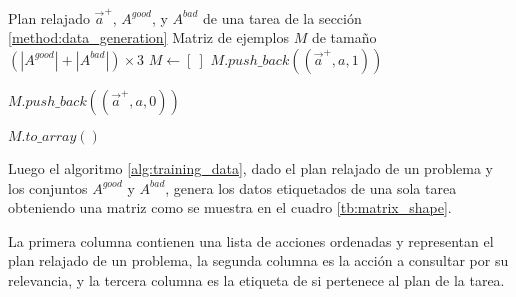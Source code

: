 \begin{algorithm}
    \caption{}\label{alg:training_data}
    \begin{algorithmic}
    \Require Plan relajado $\vec{a}^{+}$, $A^{good}$, y $A^{bad}$ de una tarea de la sección \ref{method:data_generation}
    \Ensure Matriz de ejemplos $M$ de tamaño $(|A^{good}| + |A^{bad}|) \times 3$
    \State $M \gets [\ ]$
        \State $M.push\_back((\vec{a}^{+}, a, 1))$
    \EndFor
    
        \State $M.push\_back((\vec{a}^{+}, a, 0))$
    \EndFor
    
    \State \Return $M.to\_array()$
    \end{algorithmic}
\end{algorithm}

Luego el algoritmo \ref{alg:training_data}, dado el plan relajado de un problema y los conjuntos $A^{good}$ y $A^{bad}$, genera los datos etiquetados de una sola tarea obteniendo una matriz como se muestra en el cuadro \ref{tb:matrix_shape}.

\begin{table}[h!]
\centering
{}
 \caption{Ejemplos etiquetados a partir de un plan relajado y una acción}
 \label{tb:matrix_shape}
\end{table}

La primera columna contienen una lista de acciones ordenadas y representan el plan relajado de un problema, la segunda columna es la acción a consultar por su relevancia, y la tercera columna es la etiqueta de si pertenece al plan de la tarea.

